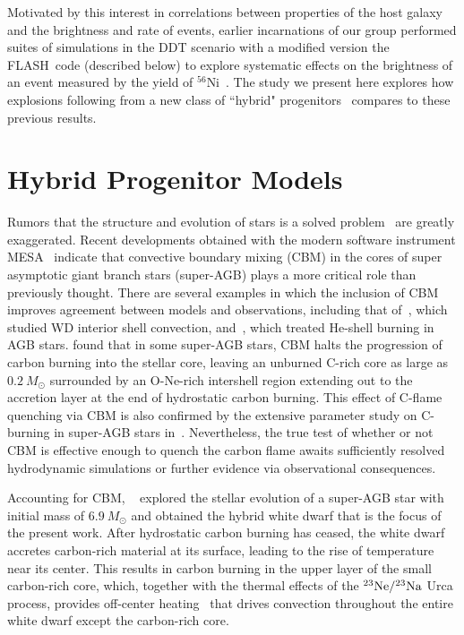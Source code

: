 \documentclass[iop,apj]{emulateapj}
\newcommand{\Ne}[1]{\ensuremath{{}^{#1}{\rm Ne}}}
\newcommand{\Na}[1]{\ensuremath{{}^{#1}{\rm Na}}}
\newcommand{\code}[1]{\textsc{#1}}
\newcommand{\FLASH}{\code{FLASH}}
\newcommand{\MESA}{\code{MESA}}
\newcommand{\Msun}{\ensuremath{M_\odot}}
\begin{document}
Motivated by this interest in correlations between properties of the
host galaxy and the brightness and rate of events, earlier incarnations of  
our group performed suites of simulations in the DDT scenario
with a modified version the \FLASH\ code (described below) to explore
systematic effects on the brightness of an event measured by the yield of
$^{56}$Ni~\citep{Krueger2010On-Variations-o,jacketal2010,kruegetal12}. The
study we present here explores how explosions following from a new class
of ``hybrid" 
progenitors~\citep{denissenkovetal2013,chenetal2014,denissenkovetal2015} 
compares to these previous results.

\section{Hybrid Progenitor Models}\label{section:hybrid_progenitor_models}
Rumors that the structure and evolution of stars is a solved
problem~\citep{HansenEtAl04} are greatly exaggerated. Recent
developments obtained with the modern software instrument
\MESA~\citep{mesa1,mesa2,mesa3,mesa3e} indicate that convective boundary
mixing (CBM) in the cores of super asymptotic giant branch stars
(super-AGB) plays a more critical role than previously thought.  There
are several examples in which the inclusion of CBM improves agreement
between models and observations, including that
of~\citet{denissenkovetal2013}, which studied WD interior shell
convection, and~\citet{herwig2005, werner.herwig.2006}, which treated
He-shell burning in AGB stars.
\citet{denissenkovetal2013,chenetal2014} found that in some super-AGB
stars, CBM halts the progression of carbon burning into the stellar
core, leaving an unburned C-rich core as large as $0.2~\Msun$
surrounded by an O-Ne-rich intershell region extending out to the
accretion layer at the end of hydrostatic carbon burning. This effect
of C-flame quenching via CBM is also confirmed by the extensive
parameter study on C-burning in super-AGB stars
in~\citet{farmeretal2015}. Nevertheless, the true test of
  whether or not CBM is effective enough to quench the carbon flame
  awaits sufficiently resolved hydrodynamic simulations or further
  evidence via observational consequences.
  
Accounting for CBM, ~\citet{denissenkovetal2015} explored
the stellar evolution of a super-AGB star with initial mass of
$6.9~\Msun$ and obtained the hybrid white dwarf that is the focus of
the present work. After hydrostatic carbon burning has ceased, the
white dwarf accretes carbon-rich material at its surface, leading to
the rise of temperature near its center. This results in carbon
burning in the upper layer of the small carbon-rich core, which,
together with the thermal effects of the $\Ne{23}/\Na{23}$ Urca process,
provides off-center heating~\citep{denissenkovetal2015} that drives
convection throughout the entire white dwarf except the carbon-rich
core.
\end{document}
